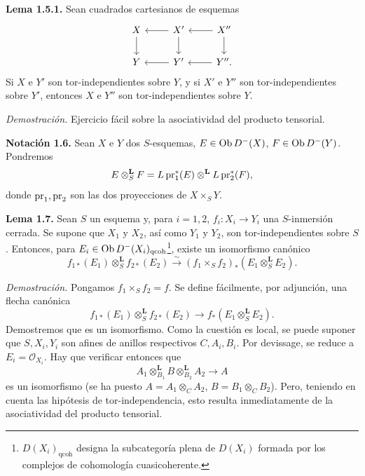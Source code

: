 \providecommand{\sisi}[2]{#2}

\textbf{Lema 1.5.1.} Sean cuadrados cartesianos de esquemas
\[
\begin{tikzcd}
X \arrow[d] & X' \arrow[l] \arrow[d] & X'' \arrow[l] \arrow[d]\\
Y & Y' \arrow[l] & Y'' \arrow[l].
\end{tikzcd}
\]
Si \(X\) e \(Y'\) son tor-independientes sobre \(Y\), y si \(X'\) e \(Y''\) son tor-independientes sobre \(Y'\), entonces \(X\) e \(Y''\) son tor-independientes sobre \(Y\).

\emph{Demostración.} Ejercicio fácil sobre la asociatividad del producto tensorial.

\textbf{Notación 1.6.} Sean \(X\) e \(Y\) dos \(S\)-esquemas, \(E\in\operatorname{Ob} D^{-}(X)\), \(F\in\operatorname{Ob} D^{-}(Y)\). Pondremos
\[
 E\otimes_S^{\mathbf L}F
 =
 L\operatorname{pr}_1^*(E)\otimes^{\mathbf L}L\operatorname{pr}_2^*(F),
\]
donde \(\operatorname{pr}_1,\operatorname{pr}_2\) son las dos proyecciones de \(X\times_SY\).

\textbf{Lema 1.7.} Sean \(S\) un esquema y, para \(i=1,2\), \(f_i:X_i\longrightarrow Y_i\) una \(S\)-inmersión cerrada. Se supone que \(X_1\) y \(X_2\), así como \(Y_1\) y \(Y_2\), son tor-independientes sobre \(S\). Entonces, para \(E_i\in\operatorname{Ob} D^{-}(X_i)_{\mathrm{qcoh}}\)\footnote{\(D(X_i)_{\mathrm{qcoh}}\) designa la subcategoría plena de \(D(X_i)\) formada por los complejos de cohomología cuasicoherente.}, existe un isomorfismo canónico
\[
 f_{1*}(E_1)\otimes_S^{\mathbf L}f_{2*}(E_2)
 \xrightarrow{\sim}
 (f_1\times_Sf_2)_*(E_1\otimes_S^{\mathbf L}E_2).
\]

\emph{Demostración.} Pongamos \(f_1\times_Sf_2=f\). Se define fácilmente, por adjunción, una flecha canónica
\[
 f_{1*}(E_1)\otimes_S^{\mathbf L}f_{2*}(E_2)
 \longrightarrow
 f_*(E_1\otimes_S^{\mathbf L}E_2).
\]
Demostremos que es un isomorfismo. Como la cuestión es local, se puede suponer que \(S,X_i,Y_i\) son afines de anillos respectivos \(C,A_i,B_i\). Por devissage, se reduce a \(E_i=\mathcal O_{X_i}\). Hay que verificar entonces que
\[
 A_1\otimes_{B_1}^{\mathbf L}B\otimes_{B_2}^{\mathbf L}A_2
 \longrightarrow A
\]
es un isomorfismo (se ha puesto \(A=A_1\otimes_C A_2\), \(B=B_1\otimes_C B_2\)). Pero, teniendo en cuenta las hipótesis de tor-independencia, esto resulta inmediatamente de la asociatividad del producto tensorial.

